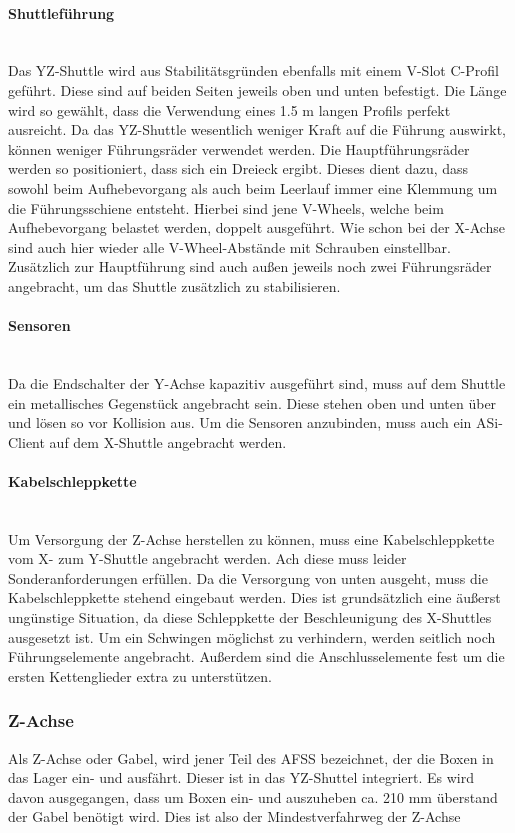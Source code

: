 \paragraph{Shuttleführung}\mbox{}\\
Das YZ-Shuttle wird aus Stabilitätsgründen ebenfalls mit einem V-Slot C-Profil geführt. Diese sind auf beiden Seiten jeweils oben und unten befestigt. Die Länge wird so gewählt, dass die Verwendung eines 1.5 m langen Profils perfekt ausreicht. Da das YZ-Shuttle wesentlich weniger Kraft auf die Führung auswirkt, können weniger Führungsräder verwendet werden. Die Hauptführungsräder werden so positioniert, dass sich ein Dreieck ergibt. Dieses dient dazu, dass sowohl beim Aufhebevorgang als auch beim Leerlauf immer eine Klemmung um die Führungsschiene entsteht. Hierbei sind jene V-Wheels, welche beim Aufhebevorgang belastet werden, doppelt ausgeführt. Wie schon bei der X-Achse sind auch hier wieder alle V-Wheel-Abstände mit Schrauben einstellbar. Zusätzlich zur Hauptführung sind auch außen jeweils noch zwei Führungsräder angebracht, um das Shuttle zusätzlich zu stabilisieren.

\paragraph{Sensoren}\mbox{}\\
Da die Endschalter der Y-Achse kapazitiv ausgeführt sind, muss auf dem Shuttle ein metallisches Gegenstück angebracht sein. Diese stehen oben und unten über und lösen so vor Kollision aus. Um die Sensoren anzubinden, muss auch ein ASi-Client auf dem X-Shuttle angebracht werden.

\paragraph{Kabelschleppkette}\mbox{}\\
Um Versorgung der Z-Achse herstellen zu können, muss eine Kabelschleppkette vom X- zum Y-Shuttle angebracht werden. Ach diese muss leider Sonderanforderungen erfüllen. Da die Versorgung von unten ausgeht, muss die Kabelschleppkette stehend eingebaut werden. Dies ist grundsätzlich eine äußerst ungünstige Situation, da diese Schleppkette der Beschleunigung des X-Shuttles ausgesetzt ist. Um ein Schwingen möglichst zu verhindern, werden seitlich noch Führungselemente angebracht. Außerdem sind die Anschlusselemente fest um die ersten Kettenglieder extra zu unterstützen. \cite{igus_vertikal}

\subsubsection{Z-Achse}
Als Z-Achse oder Gabel, wird jener Teil des AFSS bezeichnet, der die Boxen in das Lager ein- und ausfährt. Dieser ist in das YZ-Shuttel integriert. Es wird davon ausgegangen, dass um Boxen ein- und auszuheben ca. 210 mm überstand der Gabel benötigt wird. Dies ist also der Mindestverfahrweg der Z-Achse

